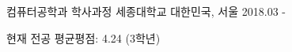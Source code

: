 

\begin{cventries}

  \cventry
    {컴퓨터공학과 학사과정} %
    {세종대학교} %
    {대한민국, 서울} %
    {2018.03 - } %
    {
      \begin{cvitems} %
        \item {현재 전공 평균평점: 4.24 (3학년)}
      \end{cvitems}
    }

\end{cventries}
